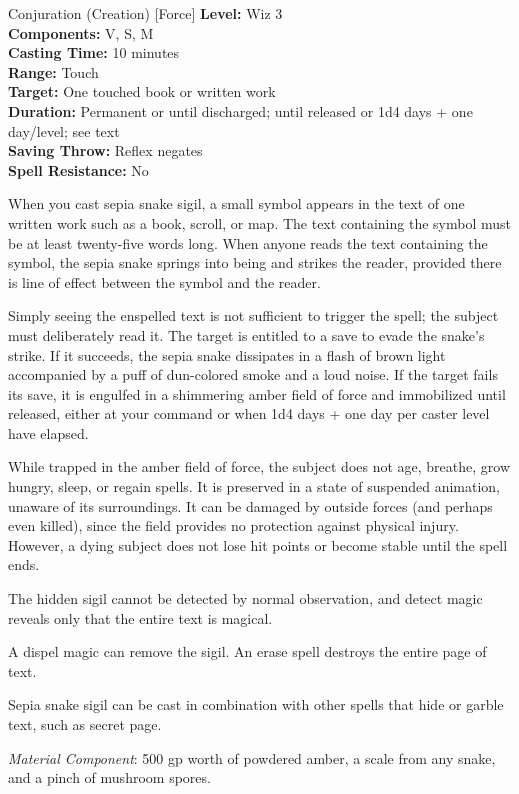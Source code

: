 {Conjuration (Creation) [Force]}
{
	\textbf{Level:}
	Wiz 3\\
	\textbf{Components:}
	V, S, M\\
	\textbf{Casting Time:}
	10 minutes\\
	\textbf{Range:}
	Touch\\
	\textbf{Target:}
	One touched book or written work\\
	\textbf{Duration:}
	Permanent or until discharged; until released or 1d4 days + one day/level; see text\\
	\textbf{Saving Throw:}
	Reflex negates\\
	\textbf{Spell Resistance:}
	No\\
}
{
	When you cast sepia snake sigil, a small symbol appears in the text of one written work such as a book, scroll, or map. The text containing the symbol must be at least twenty-five words long. When anyone reads the text containing the symbol, the sepia snake springs into being and strikes the reader, provided there is line of effect between the symbol and the reader.

	Simply seeing the enspelled text is not sufficient to trigger the spell; the subject must deliberately read it. The target is entitled to a save to evade the snake's strike. If it succeeds, the sepia snake dissipates in a flash of brown light accompanied by a puff of dun-colored smoke and a loud noise. If the target fails its save, it is engulfed in a shimmering amber field of force and immobilized until released, either at your command or when 1d4 days + one day per caster level have elapsed.

	While trapped in the amber field of force, the subject does not age, breathe, grow hungry, sleep, or regain spells. It is preserved in a state of suspended animation, unaware of its surroundings. It can be damaged by outside forces (and perhaps even killed), since the field provides no protection against physical injury. However, a dying subject does not lose hit points or become stable until the spell ends.

	The hidden sigil cannot be detected by normal observation, and detect magic reveals only that the entire text is magical.

	A dispel magic can remove the sigil. An erase spell destroys the entire page of text.

	Sepia snake sigil can be cast in combination with other spells that hide or garble text, such as secret page.

	\textit{Material Component}:
	500 gp worth of powdered amber, a scale from any snake, and a pinch of mushroom spores.

}
